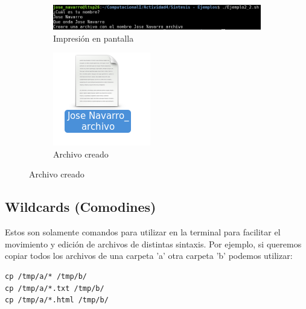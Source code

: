 \documentclass[12pt]{article}
\begin{document}
\begin{figure}[h!]
\begin{subfigure}{.55\textwidth}
  \centering
  \includegraphics[width=.8\linewidth]{Ej2_21.png}
  \caption{Impresión en pantalla}
  \label{fig:sfig1}
\end{subfigure}
\begin{subfigure}{.55\textwidth}
  \centering
  \includegraphics[width=.55\linewidth]{Ej2_22.png}
  \caption{Archivo creado}
  \label{fig:sfig2}
\end{subfigure}
\end{figure}

\subsection{Wildcards (Comodines)}
Estos son solamente comandos para utilizar en la terminal para facilitar el movimiento y edición de archivos de distintas sintaxis. Por ejemplo, si queremos copiar todos los archivos de una carpeta 'a'  otra carpeta 'b' podemos utilizar:

\begin{verbatim}
cp /tmp/a/* /tmp/b/
cp /tmp/a/*.txt /tmp/b/
cp /tmp/a/*.html /tmp/b/
\end{verbatim}
\end{document}
